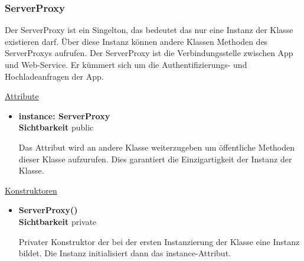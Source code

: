 \subsubsection{ServerProxy}
Der ServerProxy ist ein Singelton, das bedeutet das nur eine Instanz der  Klasse existieren darf. Über diese Instanz können andere Klassen Methoden des ServerProxys aufrufen. Der ServerProxy ist die Verbindungsstelle zwischen App und Web-Service. Er kümmert sich um die Authentifizierungs- und Hochladeanfragen der App.\newline

\underline{Attribute}
\begin{itemize}
\itemsep0pt
\item \textbf{instance: ServerProxy} \hfill\\ 
\textbf{Sichtbarkeit} public

Das Attribut wird an andere Klasse weiterzugeben um öffentliche Methoden dieser Klasse aufzurufen. Dies garantiert die Einzigartigkeit der Instanz der Klasse. 

\end{itemize}

\underline{Konstruktoren}
\begin{itemize}
\itemsep0pt
\item \textbf{ServerProxy()} \hfill\\
\textbf{Sichtbarkeit} private

Privater Konstruktor der bei der ersten Instanzierung der Klasse eine Instanz bildet. Die Instanz initialisiert dann das instance-Attribut. 
\end{itemize}

